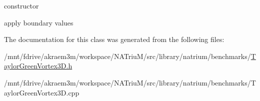 constructor 

apply boundary values 

The documentation for this class was generated from the following files:\begin{DoxyCompactItemize}
\item 
/mnt/fdrive/akraem3m/workspace/NATriuM/src/library/natrium/benchmarks/\hyperlink{TaylorGreenVortex3D_8h}{TaylorGreenVortex3D.h}\item 
/mnt/fdrive/akraem3m/workspace/NATriuM/src/library/natrium/benchmarks/TaylorGreenVortex3D.cpp\end{DoxyCompactItemize}
